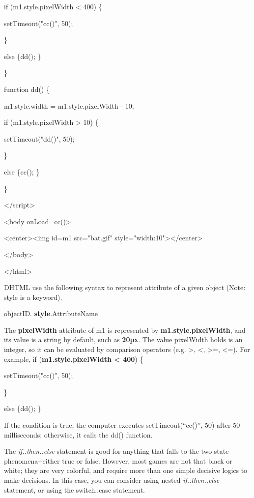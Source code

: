 \documentclass[
]{article}
\begin{document}
if (m1.style.pixelWidth \textless{} 400) \{

setTimeout("cc()", 50);

\}

else \{dd(); \}

\}

function dd() \{

m1.style.width = m1.style.pixelWidth - 10;

if (m1.style.pixelWidth \textgreater{} 10) \{

setTimeout("dd()", 50);

\}

else \{cc(); \}

\}

\textless/script\textgreater{}

\textless body onLoad=cc()\textgreater{}

\textless center\textgreater\textless img id=m1 src="bat.gif"
style="width:10"\textgreater\textless/center\textgreater{}

\textless/body\textgreater{}

\textless/html\textgreater{}

DHTML use the following syntax to represent attribute of a given object
(Note: style is a keyword).

objectID. \textbf{style}.AttributeName

The \textbf{pixelWidth} attribute of m1 is represented by
\textbf{m1.style.pixelWidth}, and its value is a string by default, such
as \textbf{20px}. The value pixelWidth holds is an integer, so it can be
evaluated by comparison operators (e.g. \textgreater, \textless,
\textgreater=, \textless=). For example, if (\textbf{m1.style.pixelWidth
\textless{} 400}) \{

setTimeout("cc()", 50);

\}

else \{dd(); \}

\textbf{}

If the condition is true, the computer executes setTimeout(``cc()'', 50)
after 50 milliseconds; otherwise, it calls the dd() function.

The \emph{if..then..else} statement is good for anything that falls to
the two-state phenomena-\/-either true or false. However, most games are
not that black or white; they are very colorful, and require more than
one simple decisive logics to make decisions. In this case, you can
consider using nested \emph{if..then..else} statement, or using the
switch..case statement.
\end{document}
